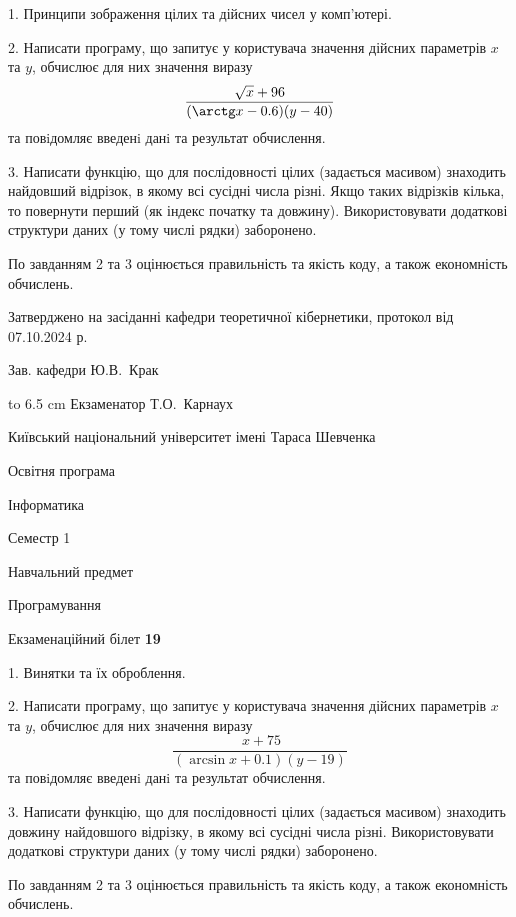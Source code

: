 \documentclass[12pt, ukrainian]{article}
\begin{document}
{%
1. Принципи зображення цілих та дійсних чисел у комп'ютері.%
\par
2. Написати програму, що запитує у користувача значення дійсних параметрів $x$ та $y$, обчислює для них значення виразу 
$$\frac{\sqrt x + 96}{(\arctg x - 0.6) (y - 40)}$$ 
та повiдомляє введенi данi та результат обчислення.

\par
3. Написати функцію, що для послідовності цілих (задається масивом) знаходить найдовший відрізок, в якому всі сусідні числа різні. Якщо таких відрізків кілька, то повернути перший (як індекс початку та довжину). Використовувати додаткові структури даних (у тому числі рядки) заборонено.

По завданням 2 та 3 оцінюється правильність та якість коду, а також економність обчислень.

}
{\smallskip\smallskip \begin {scriptsize} Затверджено на засіданні кафедри теоретичної кібернетики, протокол   від   07.10.2024 р.\par\smallskip\smallskip\smallskip\smallskip
{\parbox {6.5 cm} {Зав. кафедри \dotfill Ю.В.~Крак}}\hspace {0.7cm} {\hbox to 6.5 cm { Екзаменатор \dotfill Т.О.~Карнаух}} \end{scriptsize}}
\newpage
{{\begin {scriptsize}\par
{ \center  Київський національний університет імені Тараса Шевченка \par}
{\parbox {5 cm}{Освітня програма \hfill}{\parbox {7 cm}{Інформатика\hfill}}\parbox {6 cm}{\hfill Семестр 1}}\par
{\parbox {5 cm} {Навчальний предмет \hfill}\parbox {7 cm}{Програмування \hfill}\parbox {6cm}{\hfill}\par}\vspace{-15pt} \end{scriptsize}}{\center Екзаменаційний білет \No \textbf { 19 }\par}}
{%
1. Винятки та їх оброблення.%
\par
2. Написати програму, що запитує у користувача значення дійсних параметрів $x$ та $y$, обчислює для них значення виразу 
$$\frac{\ x + 75}{(\arcsin x + 0.1) (y - 19)}$$ 
та повiдомляє введенi данi та результат обчислення.

\par
3. Написати функцію, що для послідовності цілих (задається масивом) знаходить довжину найдовшого відрізку, в якому всі сусідні числа різні. Використовувати додаткові структури даних (у тому числі рядки) заборонено.

По завданням 2 та 3 оцінюється правильність та якість коду, а також економність обчислень.

}
\end{document}
